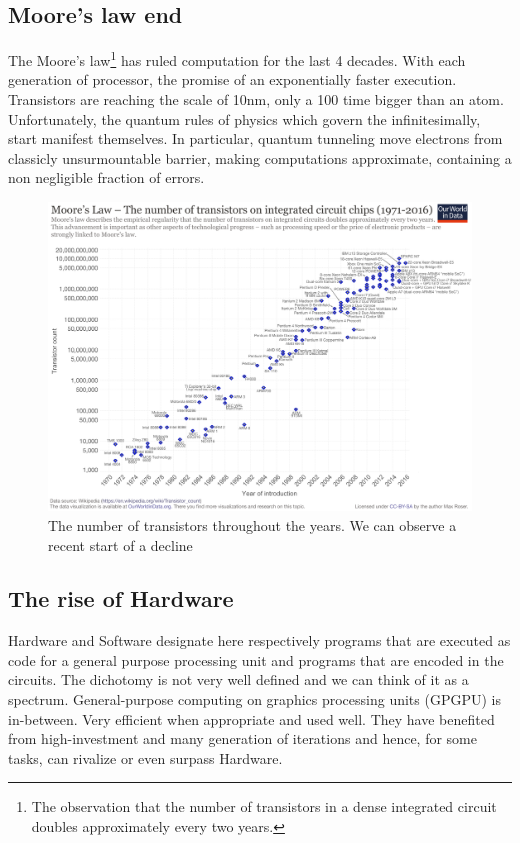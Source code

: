 \documentclass[12pt,]{article}
\begin{document}
\subsection{Moore's law end}\label{moores-law-end}

The Moore's law\footnote{The observation that the number of transistors
  in a dense integrated circuit doubles approximately every two years.}
has ruled computation for the last 4 decades. With each generation of
processor, the promise of an exponentially faster execution. Transistors
are reaching the scale of 10nm, only a 100 time bigger than an atom.
Unfortunately, the quantum rules of physics which govern the
infinitesimally, start manifest themselves. In particular, quantum
tunneling move electrons from classicly unsurmountable barrier, making
computations approximate, containing a non negligible fraction of
errors.

\begin{figure}
\centering
\includegraphics{moorelaw.png}
\caption{The number of transistors throughout the years. We can observe
a recent start of a decline}
\end{figure}

\subsection{The rise of Hardware}\label{the-rise-of-hardware}

Hardware and Software designate here respectively programs that are
executed as code for a general purpose processing unit and programs that
are encoded in the circuits. The dichotomy is not very well defined and
we can think of it as a spectrum. General-purpose computing on graphics
processing units (GPGPU) is in-between. Very efficient when appropriate
and used well. They have benefited from high-investment and many
generation of iterations and hence, for some tasks, can rivalize or even
surpass Hardware.
\end{document}
